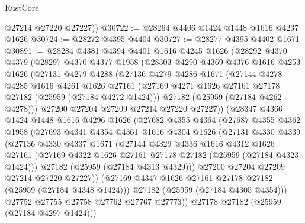 \begin{lexlean}{RustCore}
\begin{coremodule}
        @27214
        @27220
        @27227))
@30722 := @28264 @4406 @1424 @1448 @1616 @4237 @1626
@30724 := @28272 @4395 @4404
@30727 := @28277 @4395 @4402 @1671
@30891 := @28284
    @4381
    @4394
    @4401
    @1616
    @4245
    @1626
    (@28292
      @4370
      @4379
      (@28297
        @4370
        @4377
        @1958
        (@28303
          @4290
          @4369
          @4376
          @1616
          @4253
          @1626
          (@27131
            @4279
            @4288
            (@27136
              @4279
              @4286
              @1671
              (@27144
                @4278
                @4285
                @1616
                @4261
                @1626
                @27161
                (@27169 @4271 @1626 @27161 @27178 @27182 (@25959 (@27184 @4272 @1424)))
                @27182
                (@25959 (@27184 @4262 @4278)))
              @27200
              @27204
              @27209
              @27214
              @27220
              @27227))
          (@28347
            @4366
            @1424
            @1448
            @1616
            @4296
            @1626
            (@27682
              @4355
              @4364
              (@27687
                @4355
                @4362
                @1958
                (@27693
                  @4341
                  @4354
                  @4361
                  @1616
                  @4304
                  @1626
                  (@27131
                    @4330
                    @4339
                    (@27136
                      @4330
                      @4337
                      @1671
                      (@27144
                        @4329
                        @4336
                        @1616
                        @4312
                        @1626
                        @27161
                        (@27169 @4322 @1626 @27161 @27178 @27182 (@25959 (@27184 @4323 @1424)))
                        @27182
                        (@25959 (@27184 @4313 @4329)))
                      @27200
                      @27204
                      @27209
                      @27214
                      @27220
                      @27227))
                  (@27169 @4347 @1626 @27161 @27178 @27182 (@25959 (@27184 @4348 @1424)))
                  @27182
                  (@25959 (@27184 @4305 @4354)))
                @27752
                @27755
                @27758
                @27762
                @27767
                @27773))
            @27178
            @27182
            (@25959 (@27184 @4297 @1424)))

\end{coremodule}
\end{lexlean}
